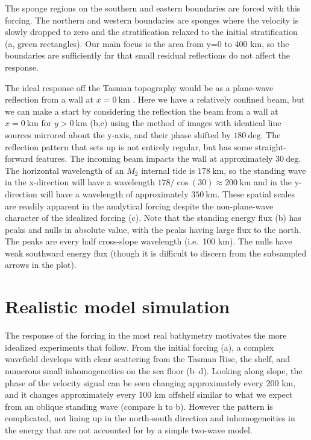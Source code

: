 \documentclass[12pt]{article}
\begin{document}
The sponge regions on the southern and eastern boundaries are forced with this forcing.  The northern and western boundaries are sponges where the velocity is slowly dropped to zero and the stratification relaxed to the initial stratification (a, green rectangles).  Our main focus is the area from y=0 to 400 km, so the boundaries are sufficiently far that small residual reflections do not affect the response.

The ideal response off the Tasman topography would be as a plane-wave reflection from a wall at $x=0\ \mathrm{km}$ \citep[i.e.][]{johnstonetal15}.  Here we have a relatively confined beam, but we can make a start by considering the reflection the beam from a wall at $x=0\ \mathrm{km}$ for $y>0\ \mathrm{km}$ (b,c) using the method of images with identical line sources mirrored about the y-axis, and their phase shifted by $180\ \mathrm{deg}$.  The reflection pattern that sets up is not entirely regular, but has some straight-forward features.  The incoming beam impacts the wall at approximately $30\ \mathrm{deg}$. The horizontal wavelength of an $M_2$ internal tide is $178\ \mathrm{km}$, so the standing wave in the x-direction will have a wavelength $178/\cos(30) \approx 200\ \mathrm{km}$ and in the y-direction will have a wavelength of approximately $350\ \mathrm{km}$.  These spatial scales are readily apparent in the analytical forcing despite the non-plane-wave character of the idealized forcing (c).  Note that the standing energy flux (b) has peaks and nulls in absolute value, with the peaks having large flux to the north. The peaks are every half cross-slope wavelength (i.e.\ 100 km).  The nulls have weak southward energy flux (though it is difficult to discern from the subsampled arrows in the plot).  

\section{Realistic model simulation}
\label{sec:Real}

The response of the forcing in the most real bathymetry motivates the more idealized experiments that follow.  From the initial forcing (a), a complex wavefield develops with clear scattering from the Tasman Rise, the shelf, and numerous small inhomogeneities on the sea floor (b--d).  Looking along slope, the phase of the velocity signal can be seen changing approximately every 200 km, and it changes approximately every 100 km offshelf similar to what we expect from an oblique standing wave (compare h to b).  However the pattern is complicated,  not lining up in the north-south direction and inhomogeneities in the energy  that are not accounted for by a simple two-wave model. 
\end{document}

